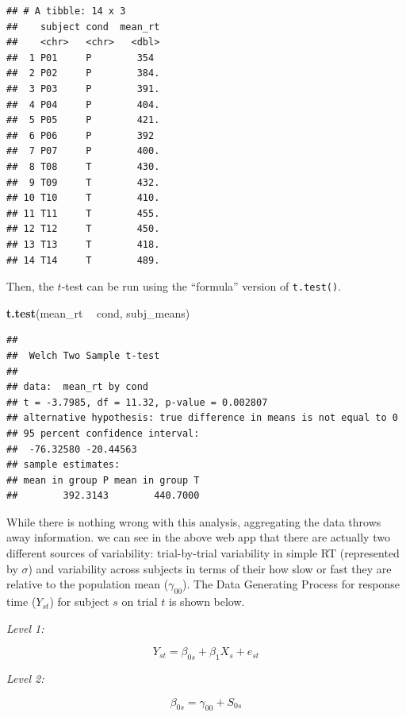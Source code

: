 \documentclass[]{book}
\newenvironment{Shaded}{\begin{snugshade}}{\end{snugshade}}
\newcommand{\KeywordTok}[1]{\textcolor[rgb]{0.13,0.29,0.53}{\textbf{#1}}}
\newcommand{\NormalTok}[1]{#1}
\newcommand{\OperatorTok}[1]{\textcolor[rgb]{0.81,0.36,0.00}{\textbf{#1}}}
\newcommand{\StringTok}[1]{\textcolor[rgb]{0.31,0.60,0.02}{#1}}
\begin{document}
\begin{verbatim}
## # A tibble: 14 x 3
##    subject cond  mean_rt
##    <chr>   <chr>   <dbl>
##  1 P01     P        354 
##  2 P02     P        384.
##  3 P03     P        391.
##  4 P04     P        404.
##  5 P05     P        421.
##  6 P06     P        392 
##  7 P07     P        400.
##  8 T08     T        430.
##  9 T09     T        432.
## 10 T10     T        410.
## 11 T11     T        455.
## 12 T12     T        450.
## 13 T13     T        418.
## 14 T14     T        489.
\end{verbatim}

Then, the \(t\)-test can be run using the ``formula'' version of \texttt{t.test()}.

\begin{Shaded}
\begin{Highlighting}[]
\KeywordTok{t.test}\NormalTok{(mean_rt }\OperatorTok{~}\StringTok{ }\NormalTok{cond, subj_means)}
\end{Highlighting}
\end{Shaded}

\begin{verbatim}
## 
## 	Welch Two Sample t-test
## 
## data:  mean_rt by cond
## t = -3.7985, df = 11.32, p-value = 0.002807
## alternative hypothesis: true difference in means is not equal to 0
## 95 percent confidence interval:
##  -76.32580 -20.44563
## sample estimates:
## mean in group P mean in group T 
##        392.3143        440.7000
\end{verbatim}

While there is nothing wrong with this analysis, aggregating the data throws away information. we can see in the above web app that there are actually two different sources of variability: trial-by-trial variability in simple RT (represented by \(\sigma\)) and variability across subjects in terms of their how slow or fast they are relative to the population mean (\(\gamma_{00}\)). The Data Generating Process for response time (\(Y_{st}\)) for subject \(s\) on trial \(t\) is shown below.

\emph{Level 1:}

\begin{equation}
Y_{st} = \beta_{0s} + \beta_{1} X_{s} + e_{st}
\end{equation}

\emph{Level 2:}

\begin{equation}
\beta_{0s} = \gamma_{00} + S_{0s}
\end{equation}
\end{document}
